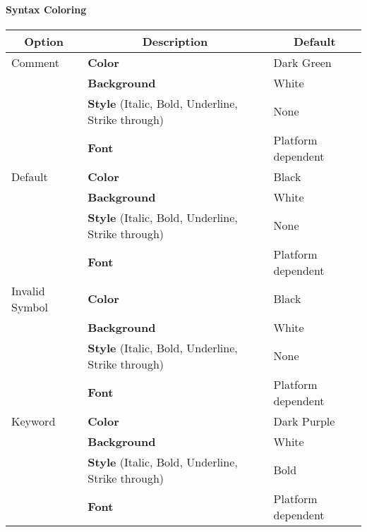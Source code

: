 \paragraph{Syntax Coloring}
\begin{EventBNoShortInline}
  \begin{table}[!htbp]
    \centering
    \begin{tabular}{|p{}|p{}|p{}|}
      \hline
      \multicolumn{1}{|c}{\textbf{Option}} & \multicolumn{1}{|c}{\textbf{Description}} &%
                                                                                         \multicolumn{1}{|c|}{\textbf{Default}} \\
      \hline
      Comment & \textbf{Color} & Dark Green \\
                                           & \textbf{Background} & White \\
                                           & \textbf{Style} (Italic, Bold, Underline, Strike through) & None \\
                                           & \textbf{Font} & Platform dependent \\
      \hline
      Default & \textbf{Color} & Black \\
                                           & \textbf{Background} & White \\
                                           & \textbf{Style} (Italic, Bold, Underline, Strike through) & None \\
                                           & \textbf{Font} & Platform dependent \\
      \hline
      Invalid Symbol & \textbf{Color} & Black \\
                                           & \textbf{Background} & White \\
                                           & \textbf{Style} (Italic, Bold, Underline, Strike through) & None \\
                                           & \textbf{Font} & Platform dependent \\
      \hline
      Keyword & \textbf{Color} & Dark Purple \\
                                           & \textbf{Background} & White \\
                                           & \textbf{Style} (Italic, Bold, Underline, Strike through) & Bold \\
                                           & \textbf{Font} & Platform dependent \\

\end{tabular}
\end{table}
\end{EventBNoShortInline}
